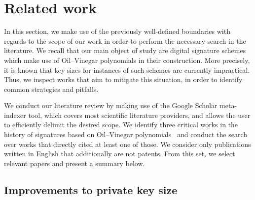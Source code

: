 \documentclass[draft, 12pt, a4paper, oneside]{memoir}
\begin{document}

\section{Related work}\label{sec:related}

In this section, we make use of the previously well-defined boundaries with regards to the scope of our work in order to perform the necessary search in the literature. We recall that our main object of study are digital signature schemes which make use of Oil--Vinegar polynomials in their construction. More precisely, it is known that key sizes for instances of such schemes are currently impractical. Thus, we inspect works that aim to mitigate this situation, in order to identify common strategies and pitfalls.

We conduct our literature review by making use of the Google Scholar meta-indexer tool, which covers most scientific literature providers, and allows the user to efficiently delimit the desired scope. We identify three critical works in the history of signatures based on Oil--Vinegar polynomials~\cite{Patarin:199709,Kipnis:199904,Ding:200506} and conduct the search over works that directly cited at least one of those. We consider only publications written in English that additionally are not patents. From this set, we select relevant papers and present a summary below.






\subsection{Improvements to private key size}
\end{document}
